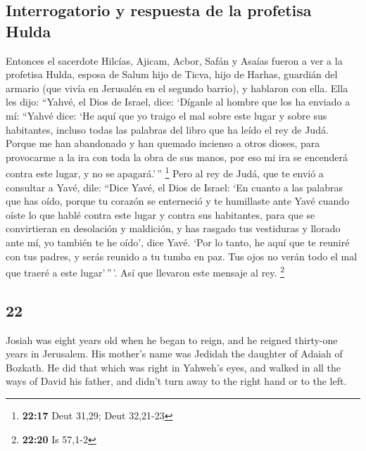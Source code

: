\begin{paracol}{2}
\hypertarget{interrogatorio-y-respuesta-de-la-profetisa-hulda}{%
\subsection{Interrogatorio y respuesta de la profetisa
Hulda}\label{interrogatorio-y-respuesta-de-la-profetisa-hulda}}

 Entonces el sacerdote Hilcías, Ajicam, Acbor, Safán y
Asaías fueron a ver a la profetisa Hulda, esposa de Salum hijo de Ticva,
hijo de Harhas, guardián del armario (que vivía en Jerusalén en el
segundo barrio), y hablaron con ella.  Ella les dijo:
``Yahvé, el Dios de Israel, dice: `Díganle al hombre que los ha enviado
a mí:  ``Yahvé dice: `He aquí que yo traigo el mal sobre
este lugar y sobre sus habitantes, incluso todas las palabras del libro
que ha leído el rey de Judá.  Porque me han abandonado y
han quemado incienso a otros dioses, para provocarme a la ira con toda
la obra de sus manos, por eso mi ira se encenderá contra este lugar, y
no se apagará.'\,'' \footnote{\textbf{22:17} Deut 31,29; Deut 32,21-23}
 Pero al rey de Judá, que te envió a consultar a Yavé,
dile: ``Dice Yavé, el Dios de Israel: `En cuanto a las palabras que has
oído,  porque tu corazón se enterneció y te humillaste
ante Yavé cuando oíste lo que hablé contra este lugar y contra sus
habitantes, para que se convirtieran en desolación y maldición, y has
rasgado tus vestiduras y llorado ante mí, yo también te he oído', dice
Yavé.  `Por lo tanto, he aquí que te reuniré con tus
padres, y serás reunido a tu tumba en paz. Tus ojos no verán todo el mal
que traeré a este lugar'\,''\,'. Así que llevaron este mensaje al rey.
\footnote{\textbf{22:20} Is 57,1-2}

\switchcolumn
\begin{otherlanguage}{english}

\hypertarget{section-43}{%
\section{22}\label{section-43}}

 Josiah was eight years old when he began to reign, and he
reigned thirty-one years in Jerusalem. His mother's name was Jedidah the
daughter of Adaiah of Bozkath.  He did that which was
right in Yahweh's eyes, and walked in all the ways of David his father,
and didn't turn away to the right hand or to the left.


\end{otherlanguage}
\end{paracol}
